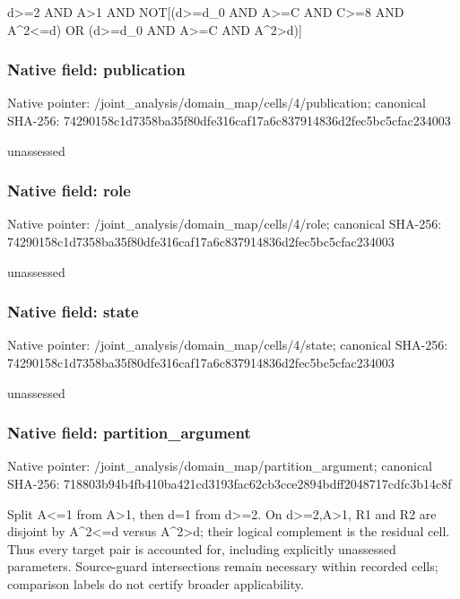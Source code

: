 \documentclass[10pt,a4paper]{article}
\begin{document}
\begingroup\raggedright\sloppy d>=\allowbreak{}2 AND A>1 AND NOT[(d>=\allowbreak{}d\_\allowbreak{}0 AND A>=\allowbreak{}C AND C>=\allowbreak{}8 AND A\textasciicircum{}2<=\allowbreak{}d) OR (d>=\allowbreak{}d\_\allowbreak{}0 AND A>=\allowbreak{}C AND A\textasciicircum{}2>d)]\par\endgroup

\subsubsection{Native field: publication}
Native pointer: /joint\_\allowbreak{}analysis/domain\_\allowbreak{}map/cells/4/publication; canonical SHA-256: 74290158c1d7358ba35f80dfe316caf17a6c837914836d2fec5bc5cfac234003

\begingroup\raggedright\sloppy unassessed\par\endgroup

\subsubsection{Native field: role}
Native pointer: /joint\_\allowbreak{}analysis/domain\_\allowbreak{}map/cells/4/role; canonical SHA-256: 74290158c1d7358ba35f80dfe316caf17a6c837914836d2fec5bc5cfac234003

\begingroup\raggedright\sloppy unassessed\par\endgroup

\subsubsection{Native field: state}
Native pointer: /joint\_\allowbreak{}analysis/domain\_\allowbreak{}map/cells/4/state; canonical SHA-256: 74290158c1d7358ba35f80dfe316caf17a6c837914836d2fec5bc5cfac234003

\begingroup\raggedright\sloppy unassessed\par\endgroup

\subsubsection{Native field: partition\_\allowbreak{}argument}
Native pointer: /joint\_\allowbreak{}analysis/domain\_\allowbreak{}map/partition\_\allowbreak{}argument; canonical SHA-256: 718803b94b4fb410ba421cd3193fac62cb3cce2894bdff2048717cdfc3b14c8f

\begingroup\raggedright\sloppy Split A<=\allowbreak{}1 from A>1,\allowbreak{} then d=\allowbreak{}1 from d>=\allowbreak{}2. On d>=\allowbreak{}2,\allowbreak{}A>1,\allowbreak{} R1 and R2 are disjoint by A\textasciicircum{}2<=\allowbreak{}d versus A\textasciicircum{}2>d;\allowbreak{} their logical complement is the residual cell. Thus every target pair is accounted for,\allowbreak{} including explicitly unassessed parameters. Source-guard intersections remain necessary within recorded cells;\allowbreak{} comparison labels do not certify broader applicability.\par\endgroup
\end{document}
